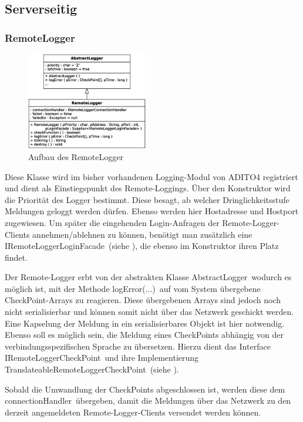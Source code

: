 \subsection{Serverseitig}
\subsubsection{RemoteLogger}
\label{sec:RemoteLogger}
\begin{figure}
	\vspace{-10px} \hspace{5px}
	\includegraphics[width=200px]{../img/CD-RemoteLogger.eps}
	\caption{Aufbau des \glqq RemoteLogger\grqq}
\end{figure}
\par Diese Klasse wird im bisher vorhandenen Logging-Modul von ADITO4 registriert und dient als Einstiegspunkt des Remote-Loggings. Über den Konstruktor wird die Priorität des Logger bestimmt. Diese besagt, ab welcher Dringlichkeitsstufe Meldungen geloggt werden dürfen. Ebenso werden hier Hostadresse und Hostport zugewiesen. Um später die eingehenden Login-Anfragen der Remote-Logger-Clients annehmen/ablehnen zu können, benötigt man zusätzlich eine \glqq IRemoteLoggerLoginFacade\grqq\ (siehe ), die ebenso im Konstruktor ihren Platz findet.
\par Der Remote-Logger erbt von der abstrakten Klasse \glqq AbstractLogger\grqq\ wodurch es möglich ist, mit der Methode \glqq logError(...)\grqq\ auf vom System übergebene CheckPoint-Arrays zu reagieren. Diese übergebenen Arrays sind jedoch noch nicht serialisierbar und können somit nicht über das Netzwerk geschickt werden. Eine Kapselung der Meldung in ein serialisierbares Objekt ist hier notwendig. Ebenso soll es möglich sein, die Meldung eines CheckPoints abhängig von der verbindungsspezifischen Sprache zu übersetzen. Hierzu dient das Interface \glqq IRemoteLoggerCheckPoint\grqq\ und ihre Implementierung \glqq TranslateableRemoteLoggerCheckPoint\grqq\ (siehe ).
\par Sobald die Umwandlung der CheckPoints abgeschlossen ist, werden diese dem \glqq connectionHandler\grqq\ übergeben, damit die Meldungen über das Netzwerk zu den derzeit angemeldeten Remote-Logger-Clients versendet werden können.

